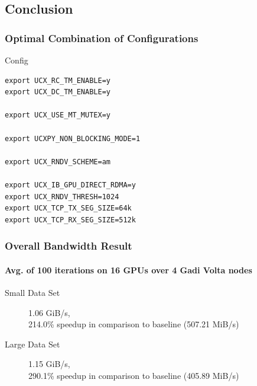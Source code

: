 \documentclass{beamer}
\begin{document}
\subsection{Conclusion}

\begin{frame}[fragile]
    \frametitle{Optimal Combination of Configurations}
    
    \begin{exampleblock}{Config}
        \begin{lstlisting}
export UCX_RC_TM_ENABLE=y
export UCX_DC_TM_ENABLE=y

export UCX_USE_MT_MUTEX=y

export UCXPY_NON_BLOCKING_MODE=1

export UCX_RNDV_SCHEME=am

export UCX_IB_GPU_DIRECT_RDMA=y
export UCX_RNDV_THRESH=1024
export UCX_TCP_TX_SEG_SIZE=64k
export UCX_TCP_RX_SEG_SIZE=512k
        \end{lstlisting}
    \end{exampleblock}
\end{frame}

\begin{frame}
    \frametitle{Overall Bandwidth Result}
    \framesubtitle{Avg. of 100 iterations on 16 GPUs over 4 Gadi Volta nodes}
    
    \begin{description}
        \item[Small Data Set] 1.06 GiB/s,\\214.0\% speedup in comparison to baseline (507.21 MiB/s)
        \item[Large Data Set] 1.15 GiB/s,\\290.1\% speedup in comparison to baseline (405.89 MiB/s)
    \end{description}
\end{frame}
\end{document}
